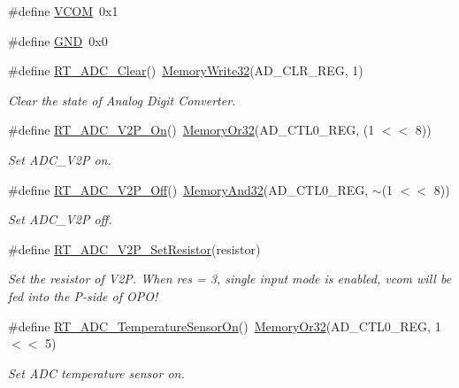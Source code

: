 \begin{DoxyCompactItemize}
\item 
\#define \mbox{\hyperlink{a00002_af5ad26ac9fe7dfd16ab8c8219b24ec93}{V\+C\+OM}}~0x1
\item 
\#define \mbox{\hyperlink{a00002_a2c058e9d24bb65c1a6ad2d439b2976ab}{G\+ND}}~0x0
\item 
\#define \mbox{\hyperlink{a00002_a00318bd4fc3ce7ad4f03124b91891f4f}{R\+T\+\_\+\+A\+D\+C\+\_\+\+Clear}}()~\mbox{\hyperlink{a00020_a6b9732365b12e48ddb89fe1028b975b0}{Memory\+Write32}}(A\+D\+\_\+\+C\+L\+R\+\_\+\+R\+EG, 1)
\begin{DoxyCompactList}\small\item\em Clear the state of Analog Digit Converter. \end{DoxyCompactList}\item 
\#define \mbox{\hyperlink{a00002_af1002dc4b0d8af47aba6aaa5de06868e}{R\+T\+\_\+\+A\+D\+C\+\_\+\+V2\+P\+\_\+\+On}}()~\mbox{\hyperlink{a00020_a27874a97deab7cecdde5ddecf466e31e}{Memory\+Or32}}(A\+D\+\_\+\+C\+T\+L0\+\_\+\+R\+EG, (1 $<$$<$ 8))
\begin{DoxyCompactList}\small\item\em Set A\+D\+C\+\_\+\+V2P on. \end{DoxyCompactList}\item 
\#define \mbox{\hyperlink{a00002_a392f47d863065820e42b66b84007dfe0}{R\+T\+\_\+\+A\+D\+C\+\_\+\+V2\+P\+\_\+\+Off}}()~\mbox{\hyperlink{a00020_ad87cedffcaadc51db22594fce55173d4}{Memory\+And32}}(A\+D\+\_\+\+C\+T\+L0\+\_\+\+R\+EG, $\sim$(1 $<$$<$ 8))
\begin{DoxyCompactList}\small\item\em Set A\+D\+C\+\_\+\+V2P off. \end{DoxyCompactList}\item 
\#define \mbox{\hyperlink{a00002_ab24203a1eff5816f48761f0e38337d67}{R\+T\+\_\+\+A\+D\+C\+\_\+\+V2\+P\+\_\+\+Set\+Resistor}}(resistor)
\begin{DoxyCompactList}\small\item\em Set the resistor of V2P. When res = 3, single input mode is enabled, vcom will be fed into the P-\/side of O\+P\+O! \end{DoxyCompactList}\item 
\#define \mbox{\hyperlink{a00002_a499716b82c53672422efd8ad4fd4c9ab}{R\+T\+\_\+\+A\+D\+C\+\_\+\+Temperature\+Sensor\+On}}()~\mbox{\hyperlink{a00020_a27874a97deab7cecdde5ddecf466e31e}{Memory\+Or32}}(A\+D\+\_\+\+C\+T\+L0\+\_\+\+R\+EG, 1 $<$$<$ 5)
\begin{DoxyCompactList}\small\item\em Set A\+DC temperature sensor on. \end{DoxyCompactList}\item 
$$
\end{DoxyCompactItemize}
